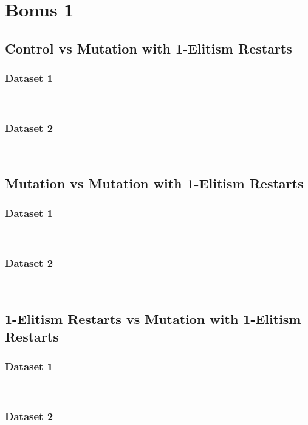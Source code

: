 \documentclass{article}
\begin{document}
\section{Bonus 1}

\subsection{Control vs Mutation with 1-Elitism Restarts}
\subsubsection{Dataset 1}
\begin{paragraph}
\\
\end{paragraph}
\subsubsection{Dataset 2}
\begin{paragraph}
\\
\end{paragraph}
\subsection{Mutation vs Mutation with 1-Elitism Restarts}
\subsubsection{Dataset 1}
\begin{paragraph}
\\
\end{paragraph}
\subsubsection{Dataset 2}
\begin{paragraph}
\\
\end{paragraph}
\subsection{1-Elitism Restarts vs Mutation with 1-Elitism Restarts}
\subsubsection{Dataset 1}
\begin{paragraph}
\\
\end{paragraph}
\subsubsection{Dataset 2}
\begin{paragraph}
\\
\end{paragraph}
\end{document}
